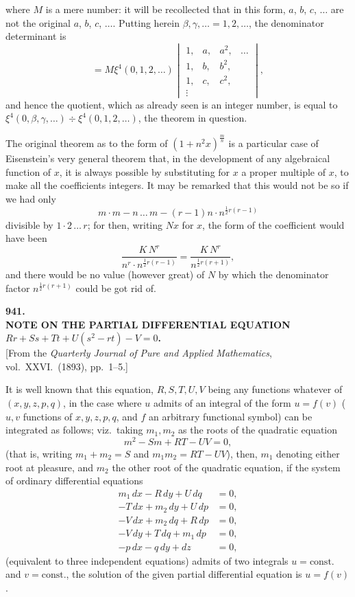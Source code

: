 \documentclass[11pt]{article}
\begin{document}
where $M$ is a mere number: it will be recollected that in this form, $a$, $b$, $c$, $\ldots$ are not the original $a$, $b$, $c$, $\ldots$. Putting herein $\beta,\gamma,\ldots = 1,2,\ldots$, the denominator determinant is
\[ = M\xi^4(0,1,2,\ldots)\begin{vmatrix} 1, & a, & a^2, & \ldots\\ 1, & b, & b^2,\\ 1, & c, & c^2,\\ \vdots \end{vmatrix}, \]
and hence the quotient, which as already seen is an integer number, is equal to $\xi^4(0,\beta,\gamma,\ldots) \div \xi^4(0,1,2,\ldots)$, the theorem in question.

The original theorem as to the form of $(1+n^2x)^{\frac{m}{n}}$ is a particular case of Eisenstein's very general theorem that, in the development of any algebraical function of $x$, it is always possible by substituting for $x$ a proper multiple of $x$, to make all the coefficients integers. It may be remarked that this would not be so if we had only
\[ m\cdot m - n\,\ldots\,m-(r-1)n\cdot n^{\frac{1}{2}r(r-1)} \]
divisible by $1\cdot 2\,\ldots\,r$; for then, writing $Nx$ for $x$, the form of the coefficient would have been
\[ \frac{K\,N^r}{n^r\cdot n^{\frac{1}{2}r(r-1)}} = \frac{K\,N^r}{n^{\frac{1}{2}r(r+1)}}, \]
and there would be no value (however great) of $N$ by which the denominator factor $n^{\frac{1}{2}r(r+1)}$ could be got rid of.

\bigskip
\begin{center}
\textbf{\large 941.}\\[4pt]
\textbf{NOTE ON THE PARTIAL DIFFERENTIAL EQUATION\\
$Rr + Ss + Tt + U(s^2-rt) - V = 0$.}\\[6pt]
[From the \textit{Quarterly Journal of Pure and Applied Mathematics}, vol.\ XXVI.\ (1893), pp.\ 1--5.]
\end{center}

It is well known that this equation, $R, S, T, U, V$ being any functions whatever of $(x,y,z,p,q)$, in the case where $u$ admits of an integral of the form $u = f(v)$ ($u, v$ functions of $x, y, z, p, q$, and $f$ an arbitrary functional symbol) can be integrated as follows; viz.\ taking $m_1, m_2$ as the roots of the quadratic equation
\[ m^2 - Sm + RT - UV = 0, \]
(that is, writing $m_1 + m_2 = S$ and $m_1 m_2 = RT - UV$), then, $m_1$ denoting either root at pleasure, and $m_2$ the other root of the quadratic equation, if the system of ordinary differential equations
\begin{align*}
m_1\,dx - R\,dy + U\,dq &= 0,\\
-T\,dx + m_2\,dy + U\,dp &= 0,\\
-V\,dx + m_2\,dq + R\,dp &= 0,\\
-V\,dy + T\,dq + m_1\,dp &= 0,\\
-p\,dx - q\,dy + dz &= 0,
\end{align*}
(equivalent to three independent equations) admits of two integrals $u = \text{const.}$ and $v = \text{const.}$, the solution of the given partial differential equation is $u = f(v)$.
\end{document}
